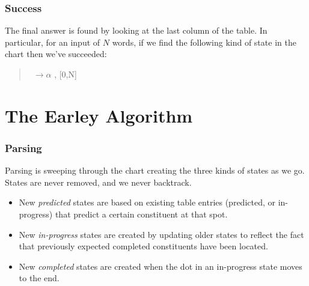




\begin{frame}[fragile]
  \frametitle{Success}


The final answer is found
by looking at the last column of the table. In particular, for an input
of $N$ words, if we
find the following kind of state in the chart then we've succeeded: 
\begin{quote}
  
  \Se\ $\rightarrow \alpha$  \bigdot, [0,N]
\end{quote}

\end{frame}

\section{The Earley Algorithm}


\begin{frame}[fragile]
  \frametitle{Parsing}


Parsing is sweeping through the chart creating the three
kinds of states as we go. States are never removed, and
we never backtrack.

\begin{itemize}
  
\item New \emph{predicted} states are based on existing table entries
  (predicted, or in-progress) that predict a certain constituent at that
  spot.
  
\item New \emph{in-progress} states are created by updating older states
  to reflect the fact that previously expected completed constituents
  have been located.
  
\item New \emph{completed} states are created when the dot in an
  in-progress state moves to the end.
\end{itemize}
\end{frame}


